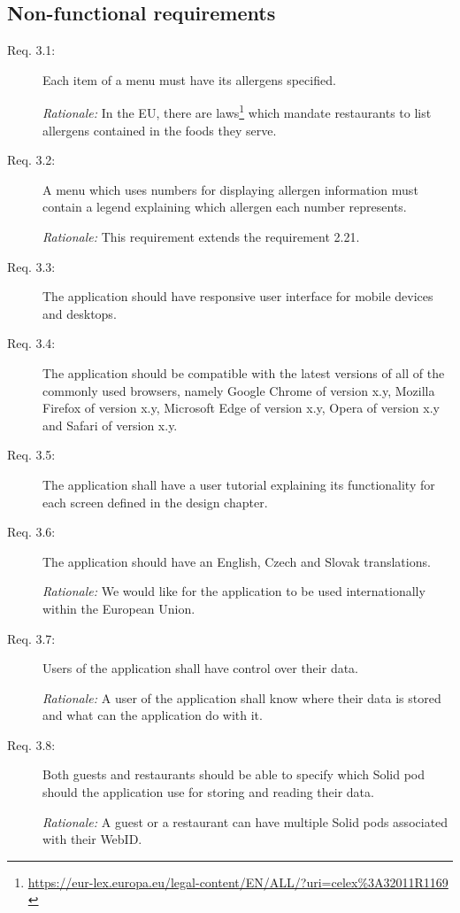 \newpage

\subsection{Non-functional requirements}
\begin{description}
    \item [Req. 3.1:] Each item of a menu must have its allergens specified.
    
    \emph{Rationale:} In the EU, there are laws\footnote{\url{https://eur-lex.europa.eu/legal-content/EN/ALL/?uri=celex\%3A32011R1169}  \label{fnlabel}} which mandate restaurants to list allergens contained in the foods they serve.
    \item [Req. 3.2:] A menu which uses numbers for displaying allergen information must contain a legend explaining which allergen each number represents.

    \emph{Rationale:} This requirement extends the requirement 2.21.
    \item [Req. 3.3:] The application should have responsive user interface for mobile devices and desktops.
    \item [Req. 3.4:] The application should be compatible with the latest versions of all of the commonly used browsers, namely Google Chrome of version x.y, Mozilla Firefox of version x.y, Microsoft Edge of version x.y, Opera of version x.y and Safari of version x.y.
    \item [Req. 3.5:] The application shall have a user tutorial explaining its functionality for each screen defined in the design chapter.
    \item [Req. 3.6:] The application should have an English, Czech and Slovak translations.

    \emph{Rationale:} We would like for the application to be used internationally within the European Union.
    \item [Req. 3.7:] Users of the application shall have control over their data.

    \emph{Rationale:} A user of the application shall know where their data is stored and what can the application do with it.
    \item [Req. 3.8:] Both guests and restaurants should be able to specify which Solid pod should the application use for storing and reading their data.

    \emph{Rationale:} A guest or a restaurant can have multiple Solid pods associated with their WebID.
\end{description}

\vspace*{\fill}